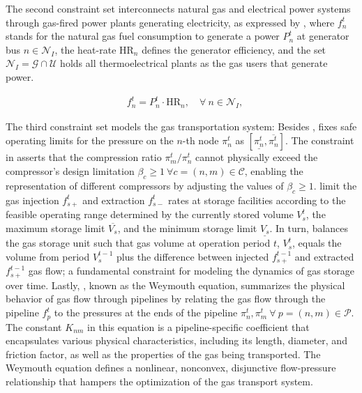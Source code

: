 The second constraint set interconnects natural gas and electrical power systems through gas-fired power plants generating electricity, as expressed by  , where $f_{n}^t$ stands for the natural gas fuel consumption to generate a power $P_{n}^t$ at generator bus $n\in\mathcal{N}_I$, the heat-rate $\text{HR}_n$ defines the generator efficiency, and the set $\mathcal{N}_I=\mathcal{G}\cap\mathcal{U}$ holds all thermoelectrical plants as the gas users that generate power.

\begin{align}
    &f_{n}^t = P_{n}^t \cdot \text{HR}_n, \quad \forall \ n \in \mathcal{N}_I, \label{eq:gas_power_relation} 
\end{align}

The third constraint set models the gas transportation system: Besides ,  fixes safe operating limits for the pressure on the $n$-th node $\pi_{n}^t$ as $[\underline{\pi_{n}^t},\overline{\pi_{n}^t}]$. The constraint in  asserts that the compression ratio $\pi_{m}^t / \pi_{n}^t$ cannot physically exceed the compressor's design limitation  $\beta_{c}\geq1 \ \forall c=(n,m) \in \mathcal{C}$, enabling the representation of different compressors by adjusting the values of $\beta_{c}\geq1$.   limit the gas injection $f_{s+}^t$  and extraction $f_{s-}^t$ rates at storage facilities according to the feasible operating range determined by the currently stored volume $V_{s}^t$, the maximum storage limit $\overline{V_s}$, and the minimum storage limit $\underline{V_s}$. In turn,  balances the gas storage unit such that gas volume at operation period $t$, $V_{s}^t$, equals the volume from period $V_{s}^{t-1}$ plus the difference between injected $f_{s+}^{t-1}$ and extracted $f_{s+}^{t-1}$ gas flow; a fundamental constraint for modeling the dynamics of gas storage over time. Lastly, , known as the Weymouth equation, summarizes the physical behavior of gas flow through pipelines by relating the gas flow through the pipeline $f_{p}^t$ to the pressures at the ends of the pipeline $\pi_{n}^t, \pi_{m}^t \ \forall \ p = (n,m) \in\mathcal{P}$. The constant $K_{nm}$ in this equation is a pipeline-specific coefficient that encapsulates various physical characteristics, including its length, diameter, and friction factor, as well as the properties of the gas being transported. The Weymouth equation defines a nonlinear, nonconvex, disjunctive flow-pressure relationship that hampers the optimization of the gas transport system.


